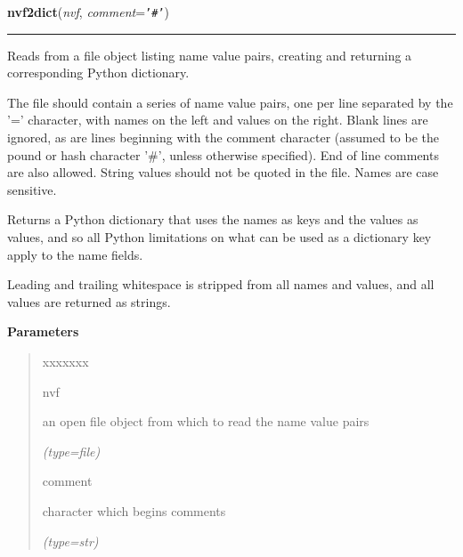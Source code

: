 \hspace{.8\funcindent}\begin{boxedminipage}{\funcwidth}

    \raggedright \textbf{nvf2dict}(\textit{nvf}, \textit{comment}={\tt \texttt{'}\texttt{\#}\texttt{'}})

    \vspace{-1.5ex}

    \rule{\textwidth}{0.5\fboxrule}
\setlength{\parskip}{2ex}
    Reads from a file object listing name value pairs, creating and 
    returning a corresponding Python dictionary.

    The file should contain a series of name value pairs, one per line 
    separated by the '=' character, with names on the left and values on 
    the right.  Blank lines are ignored, as are lines beginning with the 
    comment character (assumed to be the pound or hash character '\#', 
    unless otherwise specified).  End of line comments are also allowed.  
    String values should not be quoted in the file.  Names are case 
    sensitive.

    Returns a Python dictionary that uses the names as keys and the values 
    as values, and so all Python limitations on what can be used as a 
    dictionary key apply to the name fields.

    Leading and trailing whitespace is stripped from all names and values, 
    and all values are returned as strings.

\setlength{\parskip}{1ex}
      \textbf{Parameters}
      \vspace{-1ex}

      \begin{quote}
        \begin{Ventry}{xxxxxxx}

          \item[nvf]

          an open file object from which to read the name value pairs

            {\it (type=file)}

          \item[comment]

          character which begins comments

            {\it (type=str)}

        \end{Ventry}

      \end{quote}


\end{boxedminipage}
